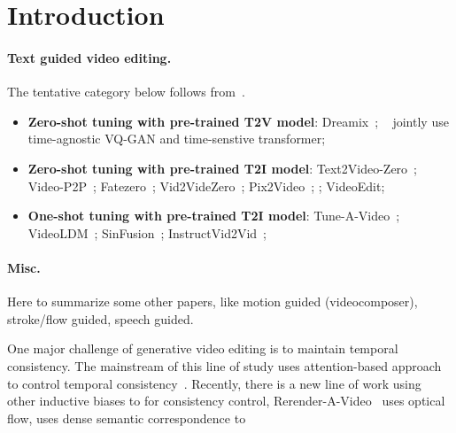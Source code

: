 \section{Introduction}
\paragraph{Text guided video editing.} The tentative category below follows from~\cite{wang2023gen}.
\begin{itemize}
    \item \textbf{Zero-shot tuning with pre-trained T2V model}: Dreamix~\citep{molad2023dreamix}; ~\cite{ge2022long} jointly use time-agnostic VQ-GAN and time-senstive transformer; 
    \item \textbf{Zero-shot tuning with pre-trained T2I model}: Text2Video-Zero~\citep{khachatryan2023text2video}; Video-P2P~\citep{liu2023video}; Fatezero~\citep{qi2023fatezero}; Vid2VideZero~\citep{wang2023zero}; Pix2Video~\citep{ceylan2023pix2video}; \citep{lee2023shape}; VideoEdit\citep{couairon2023videdit}; 
    \item \textbf{One-shot tuning with pre-trained T2I model}: Tune-A-Video~\citep{wu2022tune}; VideoLDM~\citep{blattmann2023align}; SinFusion~\citep{nikankin2022sinfusion}; InstructVid2Vid~\citep{qin2023instructvid2vid}; 

\end{itemize}

\paragraph{Misc.} Here to summarize some other papers, like motion guided (videocomposer), stroke/flow guided, speech guided.


One major challenge of generative video editing is to maintain temporal consistency. The mainstream of this line of study uses attention-based approach to control temporal consistency~\citep{wu2022tune}. Recently, there is a new line of work using other inductive biases to for consistency control, \eg Rerender-A-Video~\citep{yang2023rerender} uses optical flow, \cite{lee2023shape} uses dense semantic correspondence to 
